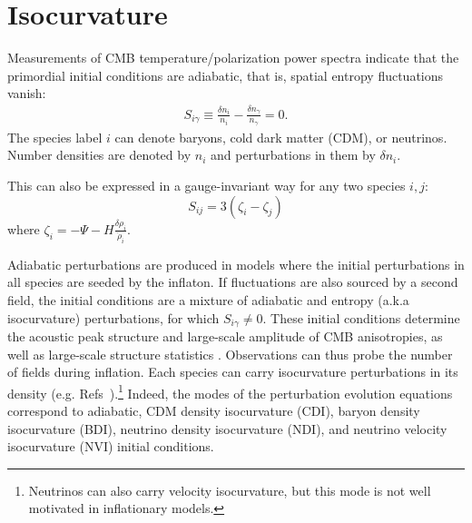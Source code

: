 \section{Isocurvature}
Measurements of CMB temperature/polarization power spectra indicate that the primordial initial conditions are adiabatic, that is, spatial entropy fluctuations vanish:
\begin{align}
S_{i \gamma}\equiv \frac{\delta n_{i}}{n_{i}}-\frac{\delta n_{\gamma}}{n_{\gamma}} =0.\end{align} The species label $i$ can denote baryons, cold dark matter (CDM), or neutrinos. Number densities are denoted by $n_{i}$ and perturbations in them by $\delta n_{i}$.

This can also be expressed in a gauge-invariant way for any two species $i,j$:
\begin{equation}
S_{ij}=3(\zeta_i-\zeta_j)
\end{equation}
where $\zeta_i = -\Psi - H \frac{\delta\rho_i}{\dot{\rho}_i}$.

Adiabatic perturbations are produced in models where the initial perturbations in all species are seeded by the inflaton. If fluctuations are also sourced by a second field, the initial conditions are a mixture of adiabatic and entropy (a.k.a isocurvature) perturbations, for which $S_{i\gamma}\neq 0$. These initial conditions determine the acoustic peak structure and large-scale amplitude of CMB anisotropies, as well as large-scale structure statistics \cite{Bond:1984fp,Kodama:1986fg,Kodama:1986ud,Hu:1994jd,Moodley:2004nz,Bean:2006qz}. Observations can thus probe the number of fields during inflation. 
\label{sec:isosec}
Each species can carry isocurvature perturbations in its density (e.g. Refs~\cite{Bucher:1999re,Bucher:2004an,Moodley:2004nz}).\footnote{Neutrinos can also carry velocity isocurvature, but this mode is not well motivated in inflationary models.} Indeed, the modes of the perturbation evolution equations correspond to adiabatic, CDM density isocurvature (CDI), baryon density isocurvature (BDI), neutrino density isocurvature (NDI), and neutrino velocity isocurvature (NVI) initial conditions. 


